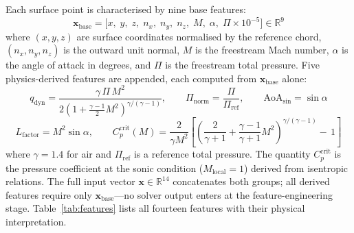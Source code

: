 \documentclass{WCCM-ECCOMAS_2026_Full_Paper}
\begin{document}
Each surface point is characterised by nine base features:
\begin{equation}
  \mathbf{x}_{\mathrm{base}}
  = \bigl[x,\;y,\;z,\;n_x,\;n_y,\;n_z,\;M,\;\alpha,\;
          \Pi{\times}10^{-5}\bigr]
  \in \mathbb{R}^{9}
  \label{eq:xbase}
\end{equation}
where $(x,y,z)$ are surface coordinates normalised by the reference
chord, $(n_x,n_y,n_z)$ is the outward unit normal, $M$ is the
freestream Mach number, $\alpha$ is the angle of attack in degrees,
and $\Pi$ is the freestream total pressure.  Five physics-derived
features are appended, each computed from $\mathbf{x}_{\mathrm{base}}$
alone:
\begin{equation}
  q_{\mathrm{dyn}} = \frac{\gamma\,\Pi\,M^{2}}
    {2\!\left(1+\tfrac{\gamma-1}{2}M^{2}\right)^{\!\gamma/(\gamma-1)}},
  \qquad
  \Pi_{\mathrm{norm}} = \frac{\Pi}{\Pi_{\mathrm{ref}}},
  \qquad
  \mathrm{AoA}_{\sin} = \sin\alpha
  \label{eq:derived1}
\end{equation}
\begin{equation}
  L_{\mathrm{factor}} = M^{2}\sin\alpha,
  \qquad
  C_{p}^{\mathrm{crit}}(M) =
    \frac{2}{\gamma M^{2}}\!\left[
      \left(\frac{2}{\gamma+1}+\frac{\gamma-1}{\gamma+1}M^{2}\right)^{\!\!
        \gamma/(\gamma-1)}\!\!\!-\,1\right]
  \label{eq:cpcrit}
\end{equation}
where $\gamma = 1.4$ for air and $\Pi_{\mathrm{ref}}$ is a reference
total pressure.  The quantity $C_{p}^{\mathrm{crit}}$ is the pressure
coefficient at the sonic condition ($M_{\mathrm{local}}=1$) derived
from isentropic relations.  The full input vector
$\mathbf{x}\in\mathbb{R}^{14}$ concatenates both groups; all derived
features require only $\mathbf{x}_{\mathrm{base}}$---no solver output
enters at the feature-engineering stage.  Table~\ref{tab:features}
lists all fourteen features with their physical interpretation.
\end{document}
